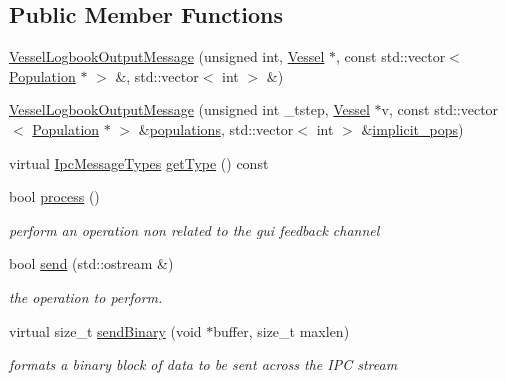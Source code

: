 \subsection*{Public Member Functions}
\begin{DoxyCompactItemize}
\item 
\mbox{\hyperlink{class_vessel_logbook_output_message_a8e148fec26b9f18b7a1e48e068efc0ff}{Vessel\+Logbook\+Output\+Message}} (unsigned int, \mbox{\hyperlink{class_vessel}{Vessel}} $\ast$, const std\+::vector$<$ \mbox{\hyperlink{class_population}{Population}} $\ast$ $>$ \&, std\+::vector$<$ int $>$ \&)
\item 
\mbox{\hyperlink{class_vessel_logbook_output_message_a2ddba61c5e80afc0745f275562328bf4}{Vessel\+Logbook\+Output\+Message}} (unsigned int \+\_\+tstep, \mbox{\hyperlink{class_vessel}{Vessel}} $\ast$v, const std\+::vector$<$ \mbox{\hyperlink{class_population}{Population}} $\ast$ $>$ \&\mbox{\hyperlink{thread__vessels_8cpp_a52b340841e812112c424c384bb9e7ebc}{populations}}, std\+::vector$<$ int $>$ \&\mbox{\hyperlink{thread__vessels_8cpp_a249b6522d595e6a057580471ab5a4517}{implicit\+\_\+pops}})
\item 
virtual \mbox{\hyperlink{ipcmsgtypes_8h_a59f75a61492e64aebfae0cc49cc26683}{Ipc\+Message\+Types}} \mbox{\hyperlink{class_vessel_logbook_output_message_a2fadf88d13091f268a7a443bc3638c6c}{get\+Type}} () const
\item 
bool \mbox{\hyperlink{class_vessel_logbook_output_message_a1892b1fa2d328eee48f88a52d6bd96b3}{process}} ()
\begin{DoxyCompactList}\small\item\em perform an operation non related to the gui feedback channel \end{DoxyCompactList}\item 
bool \mbox{\hyperlink{class_vessel_logbook_output_message_a39a68c1cc103eef690f75c4881ceaee4}{send}} (std\+::ostream \&)
\begin{DoxyCompactList}\small\item\em the operation to perform. \end{DoxyCompactList}\item 
virtual size\+\_\+t \mbox{\hyperlink{class_vessel_logbook_output_message_af1453fd8c283bbf6eb7f2ef00bc33a5f}{send\+Binary}} (void $\ast$buffer, size\+\_\+t maxlen)
\begin{DoxyCompactList}\small\item\em formats a binary block of data to be sent across the I\+PC stream \end{DoxyCompactList}\end{DoxyCompactItemize}


